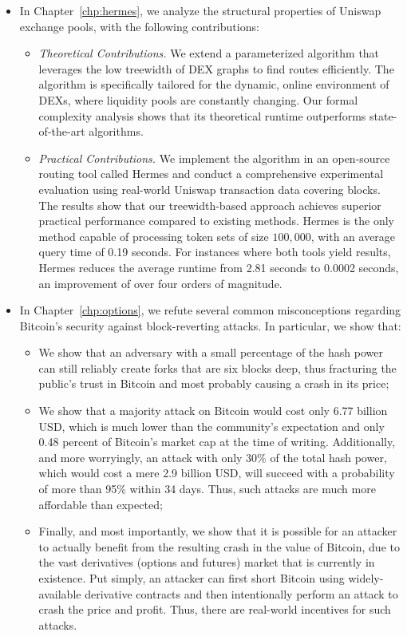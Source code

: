 \begin{itemize}
    \item In Chapter~\ref{chp:hermes}, we analyze the structural properties of Uniswap exchange pools, with the following contributions:
    \begin{itemize}
        \item \emph{Theoretical Contributions.} We extend a parameterized algorithm that leverages the low treewidth of DEX graphs to find routes efficiently. The algorithm is specifically tailored for the dynamic, online environment of DEXs, where liquidity pools are constantly changing. Our formal complexity analysis shows that its theoretical runtime outperforms state-of-the-art algorithms.
        \item \emph{Practical Contributions.} We implement the algorithm in an open-source routing tool called Hermes and conduct a comprehensive experimental evaluation using real-world Uniswap transaction data covering  blocks. The results show that our treewidth-based approach achieves superior practical performance compared to existing methods. Hermes is the only method capable of processing token sets of size $100{,}000$, with an average query time of 0.19 seconds. For instances where both tools yield results, Hermes reduces the average runtime from 2.81 seconds to 0.0002 seconds, an improvement of over four orders of magnitude.
    \end{itemize}

    \item In Chapter~\ref{chp:options}, we refute several common misconceptions regarding Bitcoin's security against block-reverting attacks. In particular, we show that:
    \begin{itemize}
        \item We show that an adversary with a small percentage of the hash power can still reliably create forks that are six blocks deep, thus fracturing the public's trust in Bitcoin and most probably causing a crash in its price;
        \item We show that a majority attack on Bitcoin would cost only 6.77 billion USD, which is much lower than the community's expectation and only 0.48 percent of Bitcoin's market cap at the time of writing. Additionally, and more worryingly, an attack with only 30\% of the total hash power, which would cost a mere 2.9 billion USD, will succeed with a probability of more than 95\% within 34 days. Thus, such attacks are much more affordable than expected;
        \item Finally, and most importantly, we show that it is possible for an attacker to actually benefit from the resulting crash in the value of Bitcoin, due to the vast derivatives (options and futures) market that is currently in existence. Put simply, an attacker can first short Bitcoin using widely-available derivative contracts and then intentionally perform an attack to crash the price and profit. Thus, there are real-world incentives for such attacks.
    \end{itemize}
\end{itemize}

